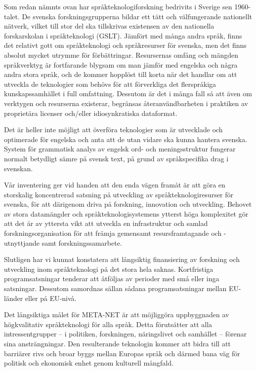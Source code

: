 \begin{multicols}{2}
Som redan nämnts ovan har språkteknologiforskning bedrivits i Sverige
sen 1960-talet. De svenska forskningsgrupperna bildar ett tätt och
välfungerande nationellt nätverk, vilket till stor del ska tillskrivas
existensen av den nationella forskarskolan i språkteknologi
(GSLT). Jämfört med många andra språk, finns det relativt gott om
språkteknologi och språkresurser för svenska, men det finns absolut
mycket utrymme för förbättringar. Resursernas omfång och mängden
språkverktyg är fortfarande blygsam om man jämför med engelska och
några andra stora språk, och de kommer hopplöst till korta när det
handlar om att utveckla de teknologier som behövs för att förverkliga
det flerspråkiga kunskapssamhället i full omfattning. Dessutom är det
i många fall så att även om verktygen och resurserna existerar,
begränsas återanvändbarheten i praktiken av proprietära licenser
och/eller idiosynkratiska dataformat.

Det är heller inte möjligt att överföra teknologier som är utvecklade
och optimerade för engelska och anta att de utan vidare ska kunna
hantera svenska. System för grammatisk analys av engelsk ord- och
meningsstruktur fungerar normalt betydligt sämre på svensk text, på
grund av språkspecifika drag i svenskan.

Vår inventering ger vid handen att den enda vägen framåt är att göra
en storskalig koncentrerad satsning på utveckling av
språkteknologiresurser för svenska, för att därigenom driva på
forskning, innovation och utveckling. Behovet av stora datamängder och
språkteknologisystemens ytterst höga komplexitet gör att det är av
yttersta vikt att utveckla en infrastruktur och samlad
forskningsorganisation för att främja gemensamt resursframtagande och
\mbox{-utnyttjande} samt forskningssamarbete.

Slutligen har vi kunnat konstatera att långsiktig finansiering av
forskning och utveckling inom språkteknologi på det stora hela
saknas. Kortfristiga programsatsningar tenderar att åtföljas av
perioder med små eller inga satsningar. Dessutom samordnas sällan
sådana programsatsningar mellan EU-länder eller på EU-nivå.

Det långsiktiga målet för META-NET är att möjliggöra uppbyggnaden av
högkvalitativ språkteknologi för alla språk. Detta förutsätter att
alla intressentgrupper -- i politiken, forskningen, näringslivet och
samhället -- förenar sina ansträngningar. Den resulterande teknologin
kommer att bidra till att barriärer rivs och broar byggs mellan
Europas språk och därmed bana väg för politisk och ekonomisk enhet
genom kulturell mångfald.
\end{multicols}


